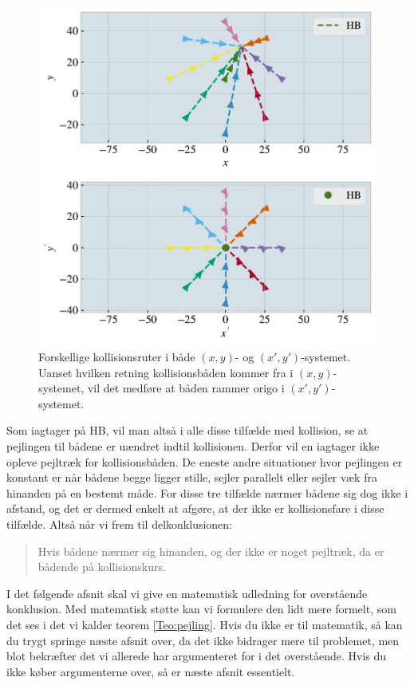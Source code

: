 \documentclass[%
 reprint,
nofootinbib,
aps,
]{revtex4-1}
\begin{document}
\begin{figure}[H]
  \includegraphics[width=\linewidth]{figures/reference_frame_explainer2.pdf}
  \caption{Forskellige kollisionsruter i både $(x,y)$- og $(x',y')$-systemet. Uanset hvilken retning kollisionsbåden kommer fra i $(x,y)$-systemet, vil det medføre at båden rammer origo i $(x',y')$-systemet.}
  \label{fig:reference_frame_explainer2}
\end{figure}

Som iagtager på HB, vil man altså i alle disse tilfælde med kollision, se at pejlingen til bådene er uændret indtil kollisionen. Derfor vil en iagtager ikke opleve pejltræk for kollisionsbåden. De eneste andre situationer hvor pejlingen er konstant er når bådene begge ligger stille, sejler parallelt eller sejler væk fra hinanden på en bestemt måde. For disse tre tilfælde nærmer bådene sig dog ikke i afstand, og det er dermed enkelt at afgøre, at der ikke er kollisionsfare i disse tilfælde. Altså når vi frem til delkonklusionen:

\begin{quote}
Hvis bådene nærmer sig hinanden, og der ikke er noget pejltræk, da er bådende på kollisionskurs.
\end{quote}

I det følgende afsnit skal vi give en matematisk udledning for overstående konklusion. Med matematisk støtte kan vi formulere den lidt mere formelt, som det ses i det vi kalder teorem \ref{Teo:pejling}. Hvis du ikke er til matematik, så kan du trygt springe næste afsnit over, da det ikke bidrager mere til problemet, men blot bekræfter det vi allerede har argumenteret for i det overstående. Hvis du ikke køber argumenterne over, så er næste afsnit essentielt.
\end{document}

